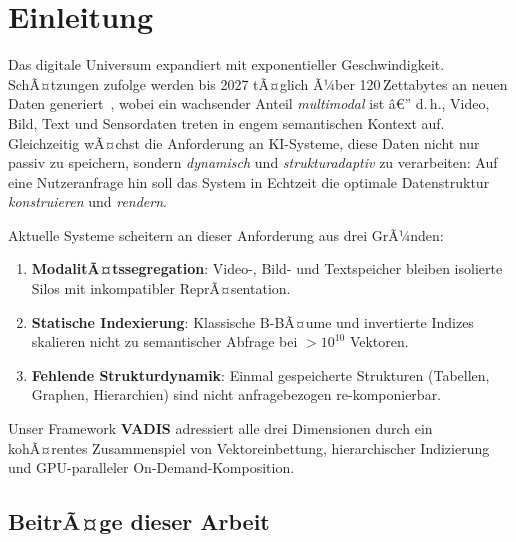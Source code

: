 ﻿\documentclass[12pt,a4paper]{article}
\begin{document}
\tableofcontents
\newpage

\section{Einleitung}
\label{sec:einleitung}

Das digitale Universum expandiert mit exponentieller Geschwindigkeit. 
SchÃ¤tzungen zufolge werden bis 2027 tÃ¤glich Ã¼ber 120\,Zettabytes an 
neuen Daten generiert~\cite{idc2024}, wobei ein wachsender Anteil 
\emph{multimodal} ist â€” d.\,h., Video, Bild, Text und Sensordaten 
treten in engem semantischen Kontext auf. Gleichzeitig wÃ¤chst die 
Anforderung an KI-Systeme, diese Daten nicht nur passiv zu speichern, 
sondern \emph{dynamisch} und \emph{strukturadaptiv} zu verarbeiten: 
Auf eine Nutzeranfrage hin soll das System in Echtzeit die optimale 
Datenstruktur \emph{konstruieren} und \emph{rendern}.

Aktuelle Systeme scheitern an dieser Anforderung aus drei GrÃ¼nden:

\begin{enumerate}[leftmargin=1.2em, itemsep=0pt, topsep=2pt]
  \item \textbf{ModalitÃ¤tssegregation}: Video-, Bild- und Textspeicher 
        bleiben isolierte Silos mit inkompatibler ReprÃ¤sentation.
  \item \textbf{Statische Indexierung}: Klassische B-BÃ¤ume und 
        invertierte Indizes skalieren nicht zu semantischer Abfrage 
        bei $>10^{10}$ Vektoren.
  \item \textbf{Fehlende Strukturdynamik}: Einmal gespeicherte 
        Strukturen (Tabellen, Graphen, Hierarchien) sind nicht 
        anfragebezogen re-komponierbar.
\end{enumerate}

Unser Framework \textbf{VADIS} adressiert alle drei Dimensionen durch 
ein kohÃ¤rentes Zusammenspiel von Vektoreinbettung, hierarchischer 
Indizierung und GPU-paralleler On-De\-mand-Komposition.

\subsection{BeitrÃ¤ge dieser Arbeit}
\end{document}
